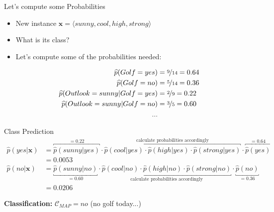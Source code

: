 \begin{frame}{Let's compute some Probabilities}{}
	\begin{itemize}
		\item New instance $\bm{x} = \langle sunny, cool, high, strong \rangle$
		\item What is its class?
		\item Let's compute some of the probabilities needed:
	\end{itemize}
	
	\begin{align*}
		\widehat{p}(Golf = yes) 						&= \nicefrac{9}{14} = 0.64 	\\
		\widehat{p}(Golf = no)						&= \nicefrac{5}{14} = 0.36 	\\
		\widehat{p}(Outlook = sunny \vert Golf = yes) 	&= \nicefrac{2}{9} = 0.22 	\\
		\widehat{p}(Outlook = sunny \vert Golf = no) 	&= \nicefrac{3}{5} = 0.60 	\\
		...
	\end{align*}
\end{frame}


\begin{frame}{Class Prediction}{}
	\vspace*{-10mm}
	\begin{align*}
		\widehat{p}(yes \vert \bm{x}) &= \overbracket{
			\widehat{p}(sunny \vert yes)
		}^{=0.22} \cdot
		\overbracket{
			\widehat{p}(cool \vert yes) \cdot \widehat{p}(high \vert yes) \cdot \widehat{p}(strong \vert yes)
		}^{\text{calculate probabilities accordingly}} \cdot
		\overbracket{
			\widehat{p}(yes)
		}^{=0.64} \\ &= \bm{0.0053}
		\\[2mm]
		\widehat{p}(no \vert \bm{x}) &= \underbracket{
			\widehat{p}(sunny \vert no)
		}_{=0.60} \cdot
		\underbracket{
			\widehat{p}(cool \vert no) \cdot \widehat{p}(high \vert no) \cdot \widehat{p}(strong \vert no)
		}_{\text{calculate probabilities accordingly}} \cdot
		\underbracket{
			\widehat{p}(no)
		}_{=0.36} \\ &= \bm{0.0206}
	\end{align*}

	\begin{boxBlueNoFrame}
		\textbf{Classification:} $\mathcal{C}_{MAP} = no$ (no golf today...)
	\end{boxBlueNoFrame}
\end{frame}


